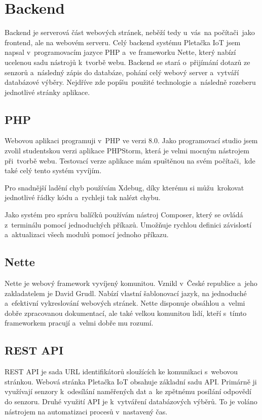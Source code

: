 \section{Backend}
Backend je serverová část webových stránek, neběží tedy u~vás~na počítači~jako frontend, ale na webovém serveru.   
Celý backend systému Pletačka IoT jsem napsal v~programovacím jazyce PHP a~ve frameworku Nette\cite{NETTE}, který nabízí ucelenou sadu nástrojů k~tvorbě webu.
Backend se stará o~přijímání dotazů ze senzorů a~následný zápis do databáze, pohání celý webový server a~vytváří databázové výběry.
Nejdříve zde popíšu~použité technologie a~následně rozeberu jednotlivé stránky aplikace.

\subsection{PHP}
Webovou aplikaci programuji v~PHP ve verzi 8.0. Jako programovací studio jsem zvolil studentskou verzi aplikace PHPStorm, která je velmi mocným nástrojem při~tvorbě webu.
Testovací verze aplikace mám spuštěnou na svém počítači,~kde také celý tento systém vyvíjím. 

Pro snadnější ladění chyb používám Xdebug, díky kterému si můžu~krokovat jednotlivé řádky kódu a~rychleji tak nalézt chybu.

Jako systém pro správu balíčků používám nástroj Composer, který se ovládá z~terminálu pomocí jednoduchých příkazů.
Umožňuje rychlou definici závislostí a~aktualizaci všech modulů pomocí jednoho příkazu.


\subsection{Nette}
Nette je webový framework vyvíjený komunitou. Vznikl v~České republice a~jeho zakladatelem je David Grudl. 
Nabízí vlastní šablonovací jazyk, na jednoduché a~efektivní vykreslování webových stránek. 
Nette disponuje obsáhlou a~velmi dobře zpracovanou dokumentací, ale také velkou komunitou lidí, kteří s~tímto frameworkem pracují a~velmi dobře mu rozumí. 


\subsection{REST API}

REST API je sada URL identifikátorů sloužících ke komunikaci s~webovou stránkou.
Webová stránka Pletačka IoT obsahuje základní sadu API.
Primárně ji využívají senzory k~odesílání naměřených dat a~ke zpětnému posílání odpovědí do senzoru.
Druhé využití API je k~vytváření databázových výběrů. 
To je voláno nástrojem na automatizaci procesů v~nastavený čas.

